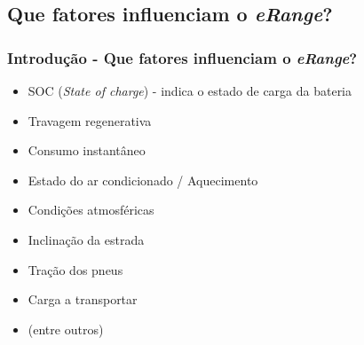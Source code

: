 \documentclass{beamer}
\begin{document}
\subsection[Que fatores influenciam o \textit{eRange}?]{Que fatores influenciam o \textit{eRange}?}
\begin{frame}
\frametitle{Introdução - Que fatores influenciam o \textit{eRange}?}

\begin{itemize}
	\item SOC (\textit{State of charge}) - indica o estado de carga da bateria
	\item Travagem regenerativa
	\item Consumo instantâneo
	\item Estado do ar condicionado / Aquecimento
	\item Condições atmosféricas
	\item Inclinação da estrada
	\item Tração dos pneus
	\item Carga a transportar
	\item (entre outros) 
\end{itemize}


\end{frame}
\end{document}

